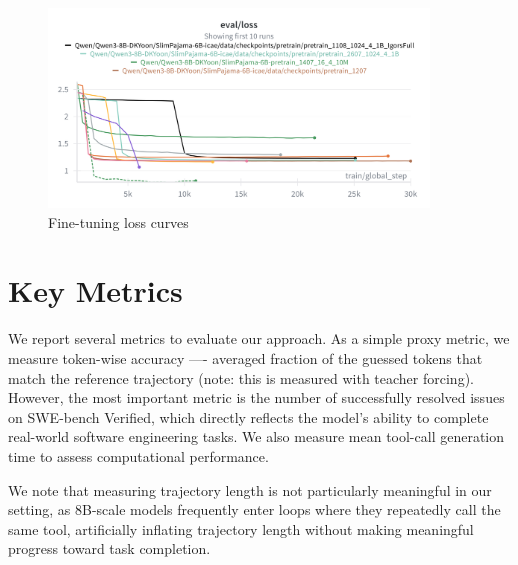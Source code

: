 \begin{figure}[hbt]
  \centering
  \includegraphics[width=0.9\textwidth]{graphs/ft_losses.png}
  \caption{Fine-tuning loss curves}
  \label{fig:ft_losses}
\end{figure}

\section{Key Metrics}
We report several metrics to evaluate our approach.
As a simple proxy metric, we measure token-wise accuracy —- averaged fraction of the guessed tokens that match the reference trajectory (note: this is measured with teacher forcing).
However, the most important metric is the number of successfully resolved issues on SWE-bench Verified, which directly reflects the model's ability to complete real-world software engineering tasks.
We also measure mean tool-call generation time to assess computational performance.

We note that measuring trajectory length is not particularly meaningful in our setting, as 8B-scale models frequently enter loops where they repeatedly call the same tool, artificially inflating trajectory length without making meaningful progress toward task completion.




